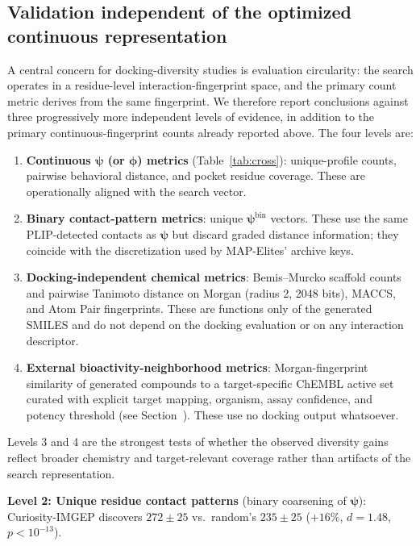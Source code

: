 \documentclass[journal=jcisd8,manuscript=article]{achemso}
\begin{document}
\subsection{Validation independent of the optimized continuous representation}
\label{sec:independent}

A central concern for docking-diversity studies is evaluation circularity: the search operates in a residue-level interaction-fingerprint space, and the primary count metric derives from the same fingerprint. We therefore report conclusions against three progressively more independent levels of evidence, in addition to the primary continuous-fingerprint counts already reported above. The four levels are:

\begin{enumerate}
    \item \textbf{Continuous $\boldsymbol{\psi}$ (or $\boldsymbol{\phi}$) metrics} (Table~\ref{tab:cross}): unique-profile counts, pairwise behavioral distance, and pocket residue coverage. These are operationally aligned with the search vector.
    \item \textbf{Binary contact-pattern metrics}: unique $\boldsymbol{\psi}^{\mathrm{bin}}$ vectors. These use the same PLIP-detected contacts as $\boldsymbol{\psi}$ but discard graded distance information; they coincide with the discretization used by MAP-Elites' archive keys.
    \item \textbf{Docking-independent chemical metrics}: Bemis--Murcko scaffold counts and pairwise Tanimoto distance on Morgan (radius 2, 2048 bits), MACCS, and Atom Pair fingerprints. These are functions only of the generated SMILES and do not depend on the docking evaluation or on any interaction descriptor.
    \item \textbf{External bioactivity-neighborhood metrics}: Morgan-fingerprint similarity of generated compounds to a target-specific ChEMBL active set curated with explicit target mapping, organism, assay confidence, and potency threshold (see Section~). These use no docking output whatsoever.
\end{enumerate}

Levels 3 and 4 are the strongest tests of whether the observed diversity gains reflect broader chemistry and target-relevant coverage rather than artifacts of the search representation.

\textbf{Level 2: Unique residue contact patterns} (binary coarsening of $\boldsymbol{\psi}$): Curiosity-IMGEP discovers $272 \pm 25$ vs.\ random's $235 \pm 25$ ($+16\%$, $d = 1.48$, $p < 10^{-13}$).
\end{document}
